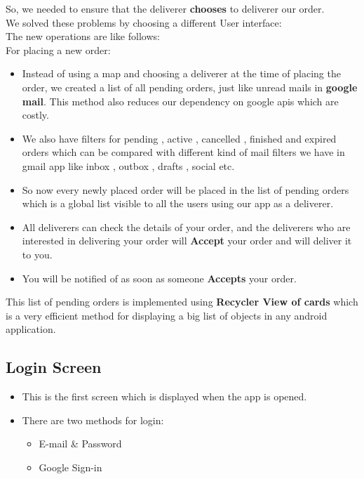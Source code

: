 \documentclass{report}
\begin{document}
So, we needed to ensure that the deliverer \textbf{chooses} to deliverer our order.\\
\newline
We solved these problems by choosing a different User interface:\\
The new operations are like follows:\\
For placing a new order:
\begin{itemize}
\item Instead of using a map and choosing a deliverer at the time of placing the order, we created a list of all pending orders, just like unread mails in \textbf{google mail}. This method also reduces our dependency on google apis which are costly.
\item We also have filters for pending , active , cancelled , finished and expired orders which can be compared with different kind of mail filters we have in gmail app like inbox , outbox , drafts , social etc.
\item So now every newly placed order will be placed in the list of pending orders which is a global list visible to all the users using our app as a deliverer.
\item All deliverers can check the details of your order, and the deliverers who are interested in delivering your order will \textbf{Accept} your order and will deliver it to you.
\item You will be notified of  as soon as someone \textbf{Accepts} your order.
\end{itemize}
This list of pending orders is implemented using \textbf{Recycler View of cards} which is a very efficient method for displaying a big list of objects in any android application.

\subsection{Login Screen}
\begin{itemize}
\item This is the first screen which is displayed when the app is opened.
\item There are two methods for login:
\begin{itemize}[label=$\rightarrow$]
\item E-mail \& Password
\item Google Sign-in
\end{itemize}

\end{itemize}
\end{document}
